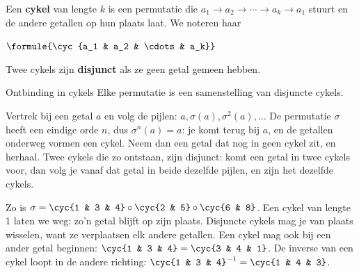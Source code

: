 \begin{theorie}
Een \textbf{\textcolor{accent}{cykel}} van lengte $k$ is een permutatie die $a_1 \to a_2 \to \cdots \to a_k \to a_1$ stuurt en de andere getallen op hun plaats laat. We noteren haar

\vspace{1mm}
\qquad $\formule{\cyc{a_1 & a_2 & \cdots & a_k}}$

\vspace{1mm}
Twee cykels zijn \textbf{\textcolor{accent}{disjunct}} als ze geen getal gemeen hebben.

\begin{stelling}{Ontbinding in cykels}
Elke permutatie is een samenstelling van disjuncte cykels.
\end{stelling}

\begin{bewijs}
Vertrek bij een getal $a$ en volg de pijlen: $a, \sigma(a), \sigma^2(a), \ldots$ De permutatie $\sigma$ heeft een eindige orde $n$, dus $\sigma^n(a) = a$: je komt terug bij $a$, en de getallen onderweg vormen een cykel. Neem dan een getal dat nog in geen cykel zit, en herhaal. Twee cykels die zo ontstaan, zijn disjunct: komt een getal in twee cykels voor, dan volg je vanaf dat getal in beide dezelfde pijlen, en zijn het dezelfde cykels.
\end{bewijs}
\end{theorie}

Zo is $\sigma = \cyc{1 & 3 & 4} \circ \cyc{2 & 5} \circ \cyc{6 & 8}$. Een cykel van lengte 1 laten we weg: zo'n getal blijft op zijn plaats. Disjuncte cykels mag je van plaats wisselen, want ze verplaatsen elk andere getallen. Een cykel mag ook bij een ander getal beginnen: $\cyc{1 & 3 & 4} = \cyc{3 & 4 & 1}$. De inverse van een cykel loopt in de andere richting: $\cyc{1 & 3 & 4}^{-1} = \cyc{1 & 4 & 3}$.


